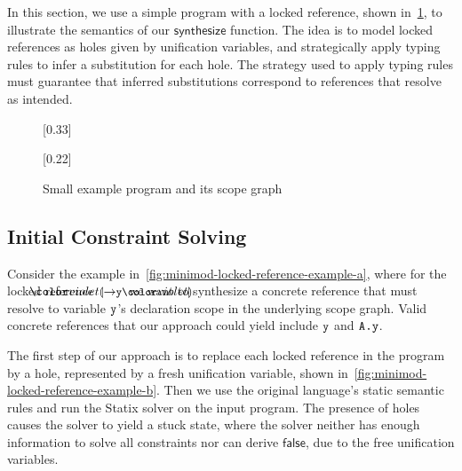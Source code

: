 In this section, we use a simple program with a locked reference, shown in~\cref{fig:minimod-locked-reference-example}, to illustrate the semantics of our $\mathsf{synthesize}$ function.
The idea is to model locked references as holes given by unification variables, and strategically apply typing rules to infer a substitution for each hole.
The strategy used to apply typing rules must guarantee that inferred substitutions correspond to references that resolve as intended.

\begin{figure}[t]
  \centering
  [0.33\textwidth]{
    
  }%
  \hfill
  [0.22\textwidth]{
    
  }%
  \hfill
  \caption{Small example program and its scope graph\hspace{0.02\textwidth}}%
  \label{fig:minimod-locked-reference-example}
\end{figure}

\subsection{Initial Constraint Solving}
Consider the example in~\cref{fig:minimod-locked-reference-example-a}, where for the locked reference $\rhole[4]{\id{y}}$ we want to synthesize a concrete reference that must resolve to variable $\texttt{y}$'s declaration scope in the underlying scope graph.
Valid concrete references that our approach could yield include $\texttt{y}$ and $\texttt{A.y}$.

The first step of our approach is to replace each locked reference in the program by a hole, represented by a fresh unification variable, shown in~\cref{fig:minimod-locked-reference-example-b}.
Then we use the original language's static semantic rules and run the Statix solver on the input program.
The presence of holes causes the solver to yield a stuck state, where the solver neither has enough information to solve all constraints nor can derive $\mathsf{false}$, due to the free unification variables.

